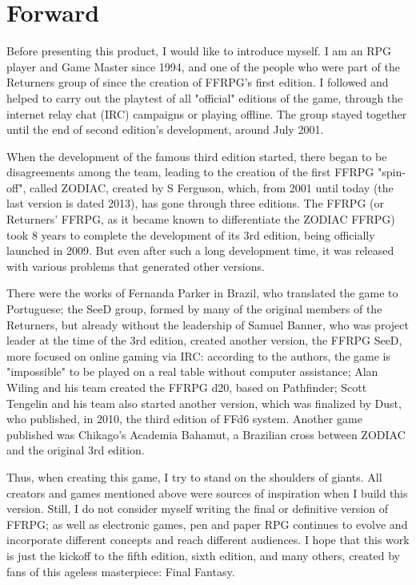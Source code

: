 \label{ch:preface}

\section*{Forward}
\label{sec:forward}
\begin{multicols}{2}
Before presenting this product, I would like
to introduce myself. I am an RPG player and Game
Master since 1994, and one of the people who
were part of the Returners group of since the
creation of FFRPG’s first edition. I followed and
helped to carry out the playtest of all "official"
editions of the game, through the internet relay
chat (IRC) campaigns or playing offline. The group
stayed together until the end of second edition’s
development, around July 2001.

When the development of the famous third
edition started, there began to be disagreements
among the team, leading to the creation of the first
FFRPG "spin-off", called ZODIAC, created by S
Ferguson, which, from 2001 until today (the last
version is dated 2013), has gone through three
editions. The FFRPG (or Returners' FFRPG, as it
became known to differentiate the ZODIAC FFRPG)
took 8 years to complete the development of its
3rd edition, being officially launched in 2009. But
even after such a long development time, it was
released with various problems that generated
other versions.

There were the works of Fernanda Parker in
Brazil, who translated the game to Portuguese; the
SeeD group, formed by many of the original
members of the Returners, but already without the
leadership of Samuel Banner, who was project
leader at the time of the 3rd edition, created
another version, the FFRPG SeeD, more focused on
online gaming via IRC: according to the authors,
the game is "impossible" to be played on a real
table without computer assistance; Alan Wiling 
and his team created the FFRPG d20, based on
Pathfinder; Scott Tengelin and his team also
started another version, which was finalized by
Dust, who published, in 2010, the third edition of
FFd6 system. Another game published was
Chikago’s Academia Bahamut, a Brazilian cross
between ZODIAC and the original 3rd edition.

Thus, when creating this game, I try to stand
on the shoulders of giants. All creators and games
mentioned above were sources of inspiration
when I build this version. Still, I do not consider
myself writing the final or definitive version of
FFRPG; as well as electronic games, pen and paper
RPG continues to evolve and incorporate different
concepts and reach different audiences. I hope that
this work is just the kickoff to the fifth edition,
sixth edition, and many others, created by fans of
this ageless masterpiece: Final Fantasy.


\end{multicols}
